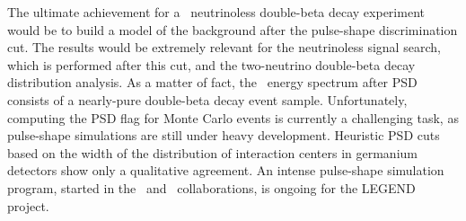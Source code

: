 \newpar
The ultimate achievement for a \gesix\ neutrinoless double-beta decay experiment would be
to build a model of the background after the pulse-shape discrimination cut. The results
would be extremely relevant for the neutrinoless signal search, which is performed after
this cut, and the two-neutrino double-beta decay distribution analysis. As a matter of
fact, the \gerda\ energy spectrum after PSD consists of a nearly-pure double-beta decay
event sample. Unfortunately, computing the PSD flag for Monte Carlo events is currently a
challenging task, as pulse-shape simulations are still under heavy development. Heuristic
PSD cuts based on the width of the distribution of interaction centers in germanium
detectors show only a qualitative agreement. An intense pulse-shape simulation program,
started in the \gerda\ and \majorana\ collaborations, is ongoing for the LEGEND project.

\chapendgliph{}

